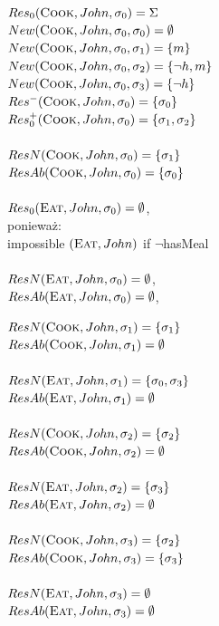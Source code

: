 \documentclass{article}
\begin{document}
\begin{minipage}[t]{0.5\textwidth}
$Res_{0}(\textsc{Cook},John,\sigma_{0})=\Sigma$\\
$New(\textsc{Cook},John,\sigma_{0},\sigma_{0})=\emptyset$\\
$New(\textsc{Cook},John,\sigma_{0},\sigma_{1})=\{m\}$\\
$New(\textsc{Cook},John,\sigma_{0},\sigma_{2})=\{\neg h,m\}$\\
$New(\textsc{Cook},John,\sigma_{0},\sigma_{3})=\{\neg h\}$\\
$Res^{-}(\textsc{Cook},John,\sigma_{0})=\{\sigma_{0}\}$\\
$Res_{0}^{+}(\textsc{Cook},John,\sigma_{0})=\{\sigma_{1},\sigma_{2}\}$\\\\
$ResN(\textsc{Cook},John,\sigma_{0})=\{\sigma_{1}\}$\\
$ResAb(\textsc{Cook},John,\sigma_{0})=\{\sigma_{0}\}$\\\\
$Res_{0}(\textsc{Eat},John,\sigma_{0})=\emptyset$,\\ 
ponieważ: \\impossible $(\textsc{Eat},John)$ if $\neg$hasMeal\\\\
$ResN(\textsc{Eat},John,\sigma_{0})=\emptyset$,\\ 
$ResAb(\textsc{Eat},John,\sigma_{0})=\emptyset$,\\ 

\end{minipage}
\begin{minipage}[t]{0.5\textwidth}
$ResN(\textsc{Cook},John,\sigma_{1})=\{\sigma_{1}\}$\\
$ResAb(\textsc{Cook},John,\sigma_{1})=\emptyset$\\\\
$ResN(\textsc{Eat},John,\sigma_{1})=\{\sigma_{0},\sigma_{3}\}$\\ 
$ResAb(\textsc{Eat},John,\sigma_{1})=\emptyset$\\\\
$ResN(\textsc{Cook},John,\sigma_{2})=\{\sigma_{2}\}$\\
$ResAb(\textsc{Cook},John,\sigma_{2})=\emptyset$\\\\
$ResN(\textsc{Eat},John,\sigma_{2})=\{\sigma_{3}\}$\\ 
$ResAb(\textsc{Eat},John,\sigma_{2})=\emptyset$\\\\
$ResN(\textsc{Cook},John,\sigma_{3})=\{\sigma_{2}\}$\\
$ResAb(\textsc{Cook},John,\sigma_{3})=\{\sigma_{3}\}$\\\\
$ResN(\textsc{Eat},John,\sigma_{3})=\emptyset$\\ 
$ResAb(\textsc{Eat},John,\sigma_{3})=\emptyset$\\\\
\end{minipage}
\end{document}
